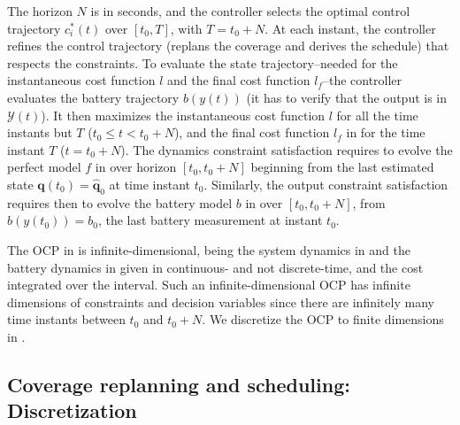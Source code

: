 The horizon $N$ is in seconds, and the controller selects the optimal control trajectory $c_i^*(t)$ over $[t_0,T]$, with $T=t_0+N$. At each instant, the controller refines the control trajectory (replans the coverage and derives the schedule) that respects the constraints. To evaluate the state trajectory--needed for the instantaneous cost function $l$ and the final cost function $l_f$--the controller evaluates the battery trajectory $b(y(t))$ (it has to verify that the output is in $\mathcal{Y}(t)$). It then maximizes the instantaneous cost function $l$ for all the time instants but $T$ ($t_0\leq t < t_0+N$), and the final cost function $l_f$ in  for the time instant $T$ ($t=t_0+N$).
The dynamics constraint satisfaction requires to evolve the perfect model $f$ in  over horizon $[t_0,t_0+N]$ beginning from the last estimated state $\mathbf{q}(t_0)=\hat{\mathbf{q}}_0$ at time instant $t_0$. Similarly, the output constraint satisfaction requires then to evolve the battery model $b$ in  over $[t_0,t_0+N]$, from $b(y(t_0))=b_0$, the last battery measurement at instant $t_0$.

The OCP in  is infinite-dimensional, being the system dynamics in  and the battery dynamics in  given in continuous- and not discrete-time, and the cost integrated over the interval. Such an infinite-dimensional OCP has infinite dimensions of constraints and decision variables since there are infinitely many time instants between $t_0$ and $t_0+N$. We discretize the OCP to finite dimensions in .

\subsection{Coverage replanning and scheduling: Discretization}
\label{sec:opt-cont-gener}

